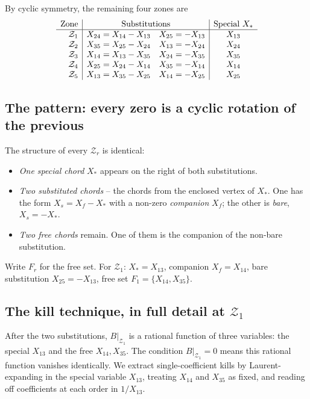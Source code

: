 \documentclass[11pt]{article}
\newcommand{\Zr}{\mathcal{Z}}
\newcommand{\Fr}{F}
\begin{document}
\medskip
\noindent By cyclic symmetry, the remaining four zones are
\[
\begin{array}{r|ll|c}
\text{Zone} & \multicolumn{2}{c|}{\text{Substitutions}} & \text{Special } X_\ast \\ \hline
\Zr_1 & X_{24} = X_{14} - X_{13} & X_{25} = -X_{13}            & X_{13} \\
\Zr_2 & X_{35} = X_{25} - X_{24} & X_{13} = -X_{24}            & X_{24} \\
\Zr_3 & X_{14} = X_{13} - X_{35} & X_{24} = -X_{35}            & X_{35} \\
\Zr_4 & X_{25} = X_{24} - X_{14} & X_{35} = -X_{14}            & X_{14} \\
\Zr_5 & X_{13} = X_{35} - X_{25} & X_{14} = -X_{25}            & X_{25} \\
\end{array}
\]

\subsection{The pattern: every zero is a cyclic rotation of the previous}

The structure of every $\Zr_r$ is identical:
\begin{itemize}\setlength\itemsep{0pt}
  \item \emph{One special chord} $X_\ast$ appears on the right of both substitutions.
  \item \emph{Two substituted chords} -- the chords from the enclosed
  vertex of $X_\ast$. One has the form $X_s = X_f - X_\ast$ with a
  non-zero \emph{companion} $X_f$; the other is \emph{bare}, $X_s = -X_\ast$.
  \item \emph{Two free chords} remain. One of them is the companion of
  the non-bare substitution.
\end{itemize}
Write $\Fr_r$ for the free set. For $\Zr_1$: $X_\ast = X_{13}$,
companion $X_f = X_{14}$, bare substitution $X_{25} = -X_{13}$, free
set $\Fr_1 = \{X_{14}, X_{35}\}$.

\subsection{The kill technique, in full detail at $\Zr_1$}

After the two substitutions, $B|_{\Zr_1}$ is a rational function of
three variables: the special $X_{13}$ and the free $X_{14}, X_{35}$.
The condition $B|_{\Zr_1} = 0$ means this rational function vanishes
identically. We extract single-coefficient kills by Laurent-expanding
in the special variable $X_{13}$, treating $X_{14}$ and $X_{35}$ as
fixed, and reading off coefficients at each order in $1/X_{13}$.
\end{document}
